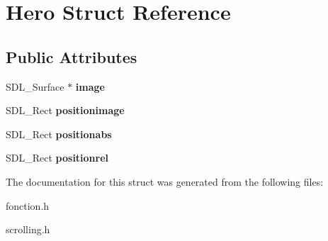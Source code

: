 \hypertarget{structHero}{}\section{Hero Struct Reference}
\label{structHero}
\subsection*{Public Attributes}
\begin{DoxyCompactItemize}
\item 
\mbox{\label{structHero_a2e497a871a41a2ea5610aa142c6dff15}} 
S\+D\+L\+\_\+\+Surface $\ast$ {\bfseries image}
\item 
\mbox{\label{structHero_a0e8676d99b32a5d48cbb6ea718f2a433}} 
S\+D\+L\+\_\+\+Rect {\bfseries positionimage}
\item 
\mbox{\label{structHero_aa504d40bc830a12f6628b23d2014bea8}} 
S\+D\+L\+\_\+\+Rect {\bfseries positionabs}
\item 
\mbox{\label{structHero_a6b44138ca819122a0a7a52d1b5cbba54}} 
S\+D\+L\+\_\+\+Rect {\bfseries positionrel}
\end{DoxyCompactItemize}


The documentation for this struct was generated from the following files\+:\begin{DoxyCompactItemize}
\item 
fonction.\+h\item 
scrolling.\+h\end{DoxyCompactItemize}
